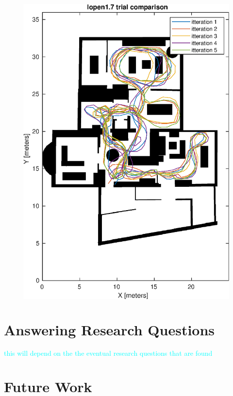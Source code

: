 \begin{figure}[H]
\begin{minipage}{.45\textwidth}
	\includegraphics[width=\linewidth]{images/20201118_1730_trial_traj_comp_6}
	\caption{}
	\label{fig:202011071142trialcomparison7}
\end{minipage}
\end{figure}



\section{Answering Research Questions}

\textcolor{cyan}{this will depend on the the eventual research questions that are found}

\section{Future Work}

